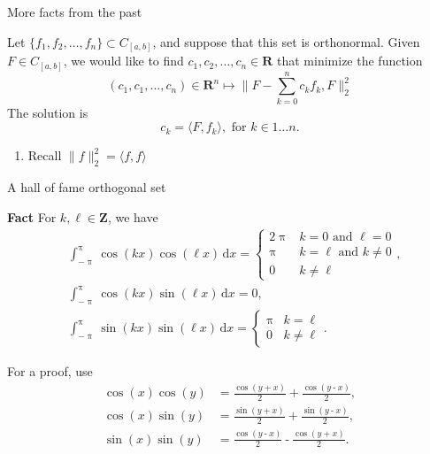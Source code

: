 \documentclass[portrait,fleqn,12pt]{beamer}
\newcommand{\reals}{\mathbf{R}}
\newcommand{\integers}{\mathbf{Z}}
\newenvironment{handlist}
   {\begin{enumerate}[\faHandPointRight]
       \addtolength{\itemsep}{0.0\itemsep}}
     {\end{enumerate}}
\begin{document}
\begin{frame}{More facts from the past}

Let  $\{f_1, f_2, \dots, f_n \} \subset C_{[a,b]}$, and suppose that this set is 
orthonormal. Given $F \in C_{[a,b]}$,
we would like to find $c_1, c_2, \dots, c_n \in \reals$ that minimize the function
\begin{equation}
  (c_1, c_1, \dots, c_n) \in \reals^n \mapsto \| F - \sum_{k=0}^n c_k f_k, F  \|_2^2
 \end{equation}
The solution is
\begin{equation}
   c_k  =  \langle F, f_k \rangle, \text{ for } k \in 1 \dots n.
\end{equation}
\begin{handlist}
\item Recall $\| f \|_2^2 = \langle f, f \rangle$
\end{handlist}
\end{frame}

\begin{frame}{A hall of fame orthogonal set}

\textbf{Fact} For $k, \ell \in \integers$, we have
\begin{align*}
&\int_{-\uppi}^\uppi \cos(k x) \cos(\ell x) \, \mathrm{d} x = \begin{cases} 
  2 \uppi & k=0 \text{ and } \ell = 0 \\
  \uppi & k = \ell \text{ and } k \neq 0 \\ 0  & k \neq  \ell \end{cases},\\
&\int_{-\uppi}^\uppi \cos(k x) \sin(\ell x) \, \mathrm{d} x = 0, \\
&\int_{-\uppi}^\uppi \sin(k x) \sin(\ell x) \, \mathrm{d} x = \begin{cases} \uppi & k = \ell \\ 0  & k \neq  \ell \end{cases}.
\end{align*}


\end{frame}
\begin{frame}{For a proof, use}
  \begin{align*}
    \cos{(x)} \cos{(y)}&\operatorname{=}\frac{\cos{\left( y\operatorname{+}x\right) }}{2}\operatorname{+}\frac{\cos{\left( y\operatorname{-}x\right) }}{2},\\
    \cos{(x)} \sin{(y)}&\operatorname{=}\frac{\sin{\left( y\operatorname{+}x\right) }}{2}\operatorname{+}\frac{\sin{\left( y\operatorname{-}x\right) }}{2},\\
    \sin{(x)} \sin{(y)}&\operatorname{=}\frac{\cos{\left( y\operatorname{-}x\right) }}{2}\operatorname{-}\frac{\cos{\left( y\operatorname{+}x\right) }}{2}.
  \end{align*}
\end{frame}
\end{document}
